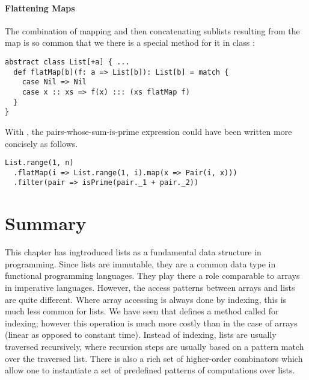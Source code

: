 \documentclass[a4paper,12pt,twoside,titlepage]{book}
\begin{document}
\paragraph{Flattening Maps}
The combination of mapping and then concatenating sublists 
resulting from the map
is so common that we there is a special method 
for it in class :
\begin{lstlisting}
abstract class List[+a] { ...
  def flatMap[b](f: a => List[b]): List[b] = match {
    case Nil => Nil
    case x :: xs => f(x) ::: (xs flatMap f)
  }
}
\end{lstlisting}
With , the pairs-whose-sum-is-prime expression 
could have been written more concisely as follows.
\begin{lstlisting}
List.range(1, n)
  .flatMap(i => List.range(1, i).map(x => Pair(i, x)))
  .filter(pair => isPrime(pair._1 + pair._2))
\end{lstlisting}



\section{Summary}

This chapter has ingtroduced lists as a fundamental data structure in
programming. Since lists are immutable, they are a common data type in
functional programming languages. They play there a role comparable to
arrays in imperative languages. However, the access patterns between
arrays and lists are quite different. Where array accessing is always
done by indexing, this is much less common for lists.  We have seen
that  defines a method called  for indexing;
however this operation is much more costly than in the case of arrays
(linear as opposed to constant time). Instead of indexing, lists are
usually traversed recursively, where recursion steps are usually based
on a pattern match over the traversed list. There is also a rich set of
higher-order combinators which allow one to instantiate a set of
predefined patterns of computations over lists.
\end{document}
